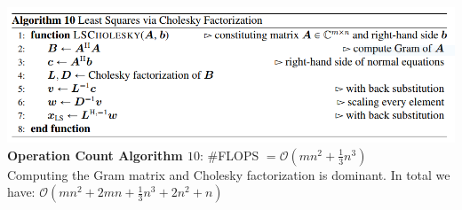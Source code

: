 \documentclass[english]{latex4ei/latex4ei_sheet}
\begin{document}
\begin{sectionbox}
\includegraphics[width=\textwidth]{img/algo10_ls_with_cholesky.PNG}\\
\textbf{Operation Count Algorithm $10$}: \#FLOPS $=\mathcal{O}(mn^2+\frac{1}{3}n^3)$\\
Computing the Gram matrix and Cholesky factorization is dominant. In total we have:
$\mathcal{O}(mn^2 + 2mn + \frac{1}{3}n^3 + 2n^2+n)$
\end{sectionbox}
\end{document}

